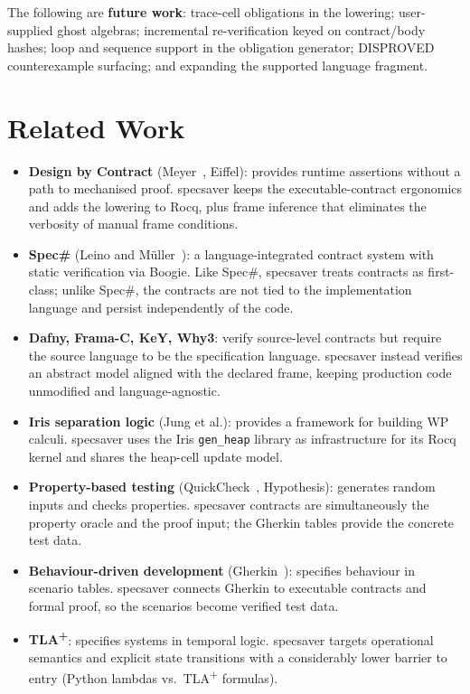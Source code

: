 \documentclass[11pt,a4paper]{article}
\begin{document}
The following are \textbf{future work}: trace-cell obligations in the
lowering; user-supplied ghost algebras; incremental re-verification
keyed on contract/body hashes; loop and sequence support in the
obligation generator; DISPROVED counterexample surfacing; and
expanding the supported language fragment.

\section{Related Work}\label{sec:related}

\begin{itemize}[leftmargin=*]

\item \textbf{Design by Contract} (Meyer~\cite{Meyer92}, Eiffel):
provides runtime assertions without a path to mechanised proof.
\textsf{specsaver} keeps the executable-contract ergonomics and adds
the lowering to Rocq, plus frame inference that eliminates the
verbosity of manual frame conditions.

\item \textbf{Spec\#} (Leino and M\"uller~\cite{Leino10}): a
language-integrated contract system with static verification via
Boogie.  Like Spec\#, \textsf{specsaver} treats contracts as
first-class; unlike Spec\#, the contracts are not tied to the
implementation language and persist independently of the code.

\item \textbf{Dafny, Frama-C, KeY, Why3}: verify source-level
contracts but require the source language to be the specification
language.  \textsf{specsaver} instead verifies an abstract model
aligned with the declared frame, keeping production code unmodified
and language-agnostic.

\item \textbf{Iris separation logic} (Jung et al.): provides a
framework for building WP calculi.  \textsf{specsaver} uses the Iris
\texttt{gen\_heap} library as infrastructure for its Rocq kernel and
shares the heap-cell update model.

\item \textbf{Property-based testing} (QuickCheck~\cite{QuickCheck},
Hypothesis): generates random inputs and checks properties.
\textsf{specsaver} contracts are simultaneously the property oracle
and the proof input; the Gherkin tables provide the concrete test
data.

\item \textbf{Behaviour-driven development} (Gherkin~\cite{Gherkin}):
specifies behaviour in scenario tables.  \textsf{specsaver} connects
Gherkin to executable contracts and formal proof, so the scenarios
become verified test data.

\item \textbf{TLA\textsuperscript{+}}: specifies systems in temporal
logic.  \textsf{specsaver} targets operational semantics and
explicit state transitions with a considerably lower barrier to entry
(Python lambdas vs.\ TLA\textsuperscript{+} formulas).

\end{itemize}
\end{document}
